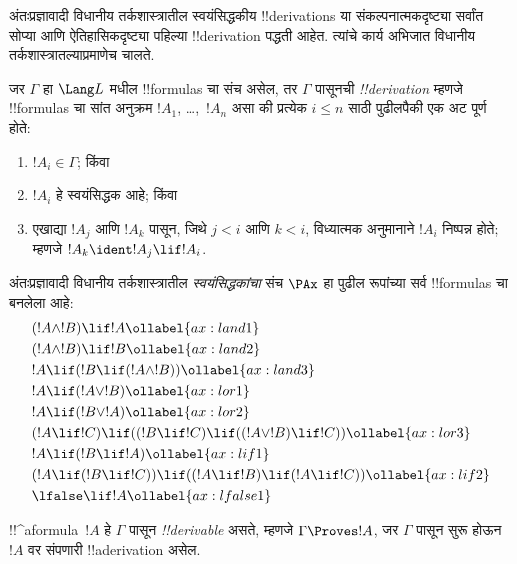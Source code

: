 \documentclass[../../../include/open-logic-section]{subfiles}
\begin{document}


अंतःप्रज्ञावादी विधानीय तर्कशास्त्रातील स्वयंसिद्धकीय
!!{derivation}s या संकल्पनात्मकदृष्ट्या सर्वांत सोप्या
आणि ऐतिहासिकदृष्ट्या पहिल्या !!{derivation}
पद्धती आहेत. त्यांचे कार्य अभिजात विधानीय
तर्कशास्त्रातल्याप्रमाणेच चालते.

\begin{defn}[!!^{derivability}]
जर $\Gamma$ हा $\Lang L$ मधील !!{formula}s चा संच
असेल, तर $\Gamma$ पासूनची \emph{!!{derivation}} म्हणजे
!!{formula}s चा सांत अनुक्रम $!A_1$, \dots,~$!A_n$
असा की प्रत्येक $i \le n$ साठी पुढीलपैकी एक अट
पूर्ण होते:
\begin{enumerate}
\item $!A_i \in \Gamma$; किंवा
\item $!A_i$ हे स्वयंसिद्धक आहे; किंवा
\item एखाद्या $!A_j$ आणि $!A_k$ पासून, जिथे $j < i$
  आणि $k < i$, विध्यात्मक अनुमानाने $!A_i$ निष्पन्न होते;
  म्हणजे $!A_k \ident !A_j \lif !A_i$.
\end{enumerate}
\end{defn}

\begin{defn}[स्वयंसिद्धके]
अंतःप्रज्ञावादी विधानीय तर्कशास्त्रातील
\emph{स्वयंसिद्धकांचा} संच $\PAx$ हा पुढील रूपांच्या
सर्व !!{formula}s चा बनलेला आहे:
\begin{align}
  & (!A \land !B) \lif !A \ollabel{ax:land1}\\
  & (!A \land !B) \lif !B \ollabel{ax:land2}\\
  & !A \lif (!B \lif (!A \land !B)) \ollabel{ax:land3}\\
  & !A \lif (!A \lor !B) \ollabel{ax:lor1}\\
  & !A \lif (!B \lor !A) \ollabel{ax:lor2}\\
  & (!A \lif !C) \lif ((!B \lif !C) \lif ((!A \lor !B) \lif !C)) \ollabel{ax:lor3}\\
  & !A \lif (!B \lif !A) \ollabel{ax:lif1}\\
  & (!A \lif (!B \lif !C)) \lif ((!A \lif !B) \lif (!A \lif !C)) \ollabel{ax:lif2}\\
  & \lfalse \lif !A \ollabel{ax:lfalse1}
\end{align}
\end{defn}

\begin{defn}[!!^{derivability}]
!!^a{formula}~$!A$ हे $\Gamma$ पासून \emph{!!{derivable}}
असते, म्हणजे $\Gamma \Proves !A$, जर $\Gamma$
पासून सुरू होऊन $!A$ वर संपणारी !!a{derivation} असेल.
\end{defn}
\end{document}
